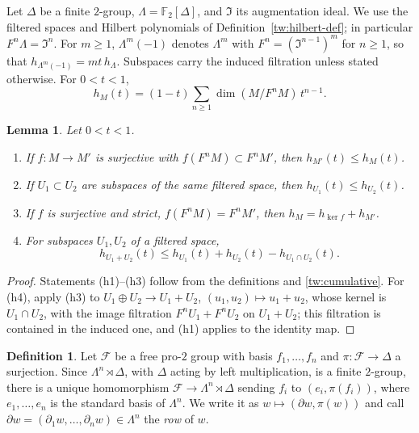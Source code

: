 \documentclass[11pt]{amsart}
\numberwithin{equation}{section}
\newtheorem{lemma}[equation]{Lemma}
\theoremstyle{definition}
\newtheorem{definition}[equation]{Definition}
\theoremstyle{remark}
\newcommand{\Ftwo}{\mathbb F_2}
\begin{document}
Let $\Delta$ be a finite $2$-group, $\Lambda=\Ftwo[\Delta]$, and
$\mathfrak I$ its augmentation ideal. We use the filtered spaces and Hilbert
polynomials of Definition~\ref{tw:hilbert-def}; in particular
$F^n\Lambda=\mathfrak I^n$. For $m\ge1$, $\Lambda^m(-1)$ denotes $\Lambda^m$
with $F^n=(\mathfrak I^{n-1})^m$ for $n\ge1$, so that
$h_{\Lambda^m(-1)}=mt\,h_\Lambda$. Subspaces carry the induced filtration
unless stated otherwise. For $0<t<1$,
\begin{equation}\label{tw:cumulative}
 h_M(t)=(1-t)\sum_{n\ge1}\dim(M/F^nM)\,t^{n-1}.
\end{equation}

\begin{lemma}\label{tw:hilbert-properties}
Let $0<t<1$.
\begin{enumerate}
\item[(h1)] If $f\colon M\to M'$ is surjective with
 $f(F^nM)\subset F^nM'$, then $h_{M'}(t)\le h_M(t)$.
\item[(h2)] If $U_1\subset U_2$ are subspaces of the same filtered space,
 then $h_{U_1}(t)\le h_{U_2}(t)$.
\item[(h3)] If $f$ is surjective and strict, $f(F^nM)=F^nM'$, then
 $h_M=h_{\ker f}+h_{M'}$.
\item[(h4)] For subspaces $U_1,U_2$ of a filtered space,
 \begin{equation}\label{tw:filtered-sum}
  h_{U_1+U_2}(t)\le h_{U_1}(t)+h_{U_2}(t)-h_{U_1\cap U_2}(t).
 \end{equation}
\end{enumerate}
\end{lemma}

\begin{proof}
Statements (h1)--(h3) follow from the definitions and \eqref{tw:cumulative}.
For (h4), apply (h3) to $U_1\oplus U_2\to U_1+U_2$, $(u_1,u_2)\mapsto u_1+u_2$,
whose kernel is $U_1\cap U_2$, with the image filtration $F^nU_1+F^nU_2$ on
$U_1+U_2$; this filtration is contained in the induced one, and (h1) applies
to the identity map.
\end{proof}

\begin{definition}\label{tw:row}
Let $\mathcal F$ be a free pro-$2$ group with basis $f_1,\dots,f_n$ and
$\pi\colon\mathcal F\to\Delta$ a surjection. Since $\Lambda^n\rtimes\Delta$,
with $\Delta$ acting by left multiplication, is a finite $2$-group, there is
a unique homomorphism $\mathcal F\to\Lambda^n\rtimes\Delta$ sending $f_i$ to
$(e_i,\pi(f_i))$, where $e_1,\dots,e_n$ is the standard basis of $\Lambda^n$.
We write it as $w\mapsto(\partial w,\pi(w))$ and call
$\partial w=(\partial_1w,\dots,\partial_nw)\in\Lambda^n$ the \emph{row} of $w$.
\end{definition}
\end{document}
